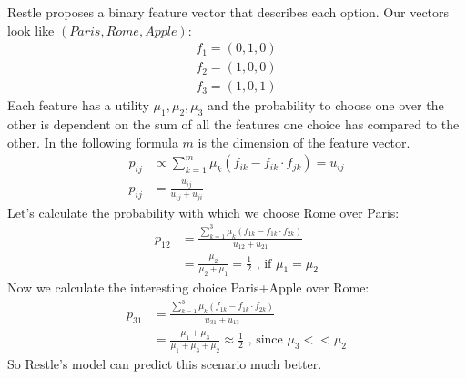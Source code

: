 \documentclass[../main/Notes.tex]{subfiles}
\begin{document}
Restle proposes a binary feature vector that describes each option. Our vectors look like $(Paris, Rome, Apple)$:
\begin{align*}
f_1 = (0, 1, 0)\\
f_2 = (1, 0, 0)\\
f_3 = (1, 0, 1)
\end{align*}
Each feature has a utility $\mu_1,\mu_2,\mu_3$ and the probability to choose one over the other is dependent on the sum of all the features one choice has compared to the other. In the following formula $m$ is the dimension of the feature vector.
\begin{align*}
p_{ij} &\propto \sum_{k=1}^{m}\mu_k(f_{ik}-f_{ik}\cdot f_{jk}) = u_{ij}\\
p_{ij} &= \frac{u_{ij}}{u_{ij}+u_{ji}}
\end{align*}
Let's calculate the probability with which we choose Rome over Paris:
\begin{align*}
p_{12} &= \frac{\sum_{k=1}^3\mu_k(f_{1k}-f_{1k} \cdot f_{2k})}{u_{12}+u_{21}}\\
       &= \frac{\mu_2}{\mu_2+\mu_1} = \frac{1}{2} \text{ , if $\mu_1=\mu_2$}
\end{align*}
Now we calculate the interesting choice Paris+Apple over Rome:
\begin{align*}
p_{31} &= \frac{\sum_{k=1}^3\mu_k(f_{1k}-f_{1k} \cdot f_{2k})}{u_{31}+u_{13}}\\
       &= \frac{\mu_1+\mu_3}{\mu_1+\mu_3+\mu_2} \approx \frac{1}{2} \text{ , since $\mu_3 << \mu_2$}
\end{align*}
So Restle's model can predict this scenario much better.
\end{document}

